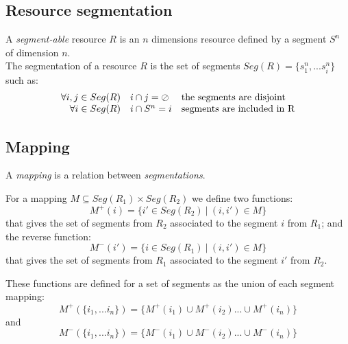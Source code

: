 \documentclass{article}
\newcommand{\emptyseg}		{\ensuremath{\oslash}}
\newcommand{\seg}[1]			{Seg(#1)}
\begin{document}
\subsection{Resource segmentation}\label{subsec:resourceseg}
A \emph{segment-able} resource $R$ is an $n$ dimensions resource defined by a segment $S^n$ of dimension $n$.\\
The segmentation of a resource $R$ is the set of segments
$\seg{R}=\{ s_1^n, ... s_i^n\}$ such as: \\
\begin{displaymath}
\begin{array}{rll}
\forall i, j \in \seg{R} & i \cap j =  \emptyseg  & $the segments are disjoint$ \\
\forall i \in \seg{R} & i \cap S^n = i & $segments are included in R$ \\
\end{array}
\end{displaymath}


\subsection{Mapping}\label{subsec:mapping}

A \emph{mapping} is a relation between \emph{segmentations}.

For a mapping $M\subseteq \seg{R_{1}}\times \seg{R_{2}}$ we define two functions:
\begin{equation}
	M^{+}(i)=\{ i'\in \seg{R_{2}}\ |\ (i,i')\in M\}
\end{equation}
that gives the set of segments from $R_{2}$ associated to the segment $i$ from $R_{1}$; 
and the reverse function:
\begin{equation}
	M^{-}(i')=\{ i \in \seg{R_{1}}\ |\ (i,i')\in M\}
\end{equation}
that gives the set of segments from $R_{1}$ associated to the segment $i'$ from $R_{2}$.


These functions are defined for a set of segments as the union of each segment mapping:
\begin{equation}
	M^{+}(\{i_1, ...i_n\}) = \{ M^{+}(i_1) \cup M^{+}(i_2) ...  \cup M^{+}(i_n) \}
\end{equation}
and
\begin{equation}
	M^{-}(\{i_1, ...i_n\})=\{ M^{-}(i_1) \cup M^{-}(i_2) ...  \cup M^{-}(i_n) \}
\end{equation}
\end{document}
